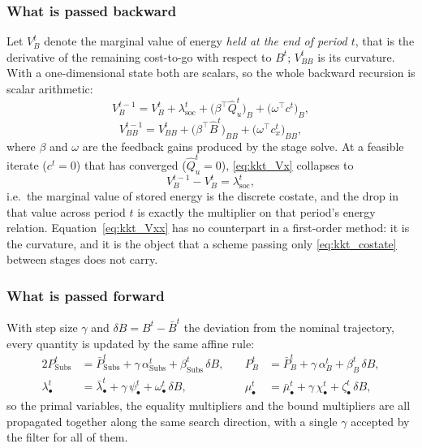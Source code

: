 \subsubsection{What is passed backward}
Let $V_B^{t}$ denote the marginal value of energy \emph{held at the end of
period $t$}, that is the derivative of the remaining cost-to-go with respect to
$B^{t}$; $V_{BB}^{t}$ is its curvature.  With a one-dimensional state both are
scalars, so the whole backward recursion is scalar arithmetic:
\begin{equation}
V_B^{t-1} = V_B^{t} + \lambda_{\text{soc}}^t
        + \bigl(\beta^\top \hat{Q}_u^t\bigr)_B + \bigl(\omega^\top c^t\bigr)_B ,
\label{eq:kkt_Vx}
\end{equation}
\begin{equation}
V_{BB}^{t-1} = V_{BB}^{t} + \bigl(\beta^\top \hat{B}^t\bigr)_{BB}
           + \bigl(\omega^\top c_x^t\bigr)_{BB} ,
\label{eq:kkt_Vxx}
\end{equation}
where $\beta$ and $\omega$ are the feedback gains produced by the stage solve.
At a feasible iterate ($c^t = 0$) that has converged ($\hat{Q}_u^t = 0$),
\eqref{eq:kkt_Vx} collapses to
\begin{equation}
V_B^{t-1} - V_B^{t} = \lambda_{\text{soc}}^t ,
\label{eq:kkt_costate}
\end{equation}
i.e.\ the marginal value of stored energy is the discrete costate, and the drop
in that value across period $t$ is exactly the multiplier on that period's
energy relation.
Equation~\eqref{eq:kkt_Vxx} has no counterpart in a first-order method: it is the
curvature, and it is the object that a scheme passing only
\eqref{eq:kkt_costate} between stages does not carry.

\subsubsection{What is passed forward}
With step size $\gamma$ and $\delta B = B^t - \bar{B}^t$ the deviation from the
nominal trajectory, every quantity is updated by the same affine rule:
\begin{alignat}{2}
P_{\text{Subs}}^t &= \bar{P}_{\text{Subs}}^t + \gamma\,\alpha_{\text{Subs}}^t
   + \beta_{\text{Subs}}^t\, \delta B , \quad&
P_B^t &= \bar{P}_B^t + \gamma\,\alpha_{B}^t + \beta_{B}^t\, \delta B ,
\label{eq:kkt_fwd_u} \\
\lambda_\bullet^t &= \bar{\lambda}_\bullet^t + \gamma\,\psi_\bullet^t
   + \omega_\bullet^t\, \delta B , &
\mu_\bullet^t &= \bar{\mu}_\bullet^t + \gamma\,\chi_\bullet^t
   + \zeta_\bullet^t\, \delta B ,
\label{eq:kkt_fwd_mult}
\end{alignat}
so the primal variables, the equality multipliers and the bound multipliers are
all propagated together along the same search direction, with a single $\gamma$
accepted by the filter for all of them.
